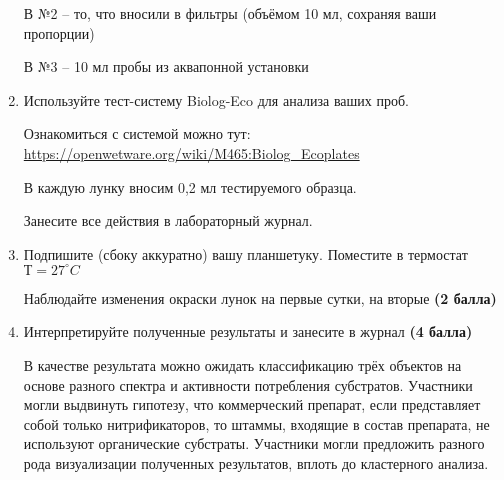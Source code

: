 \begin{enumerate}
    В №2 – то, что вносили в фильтры (объёмом 10 мл, сохраняя ваши пропорции)
    
    В №3 – 10 мл пробы из аквапонной установки

    \item Используйте тест-систему Biolog-Eco для анализа ваших проб.
    
    Ознакомиться с системой можно тут: \url{https://openwetware.org/wiki/M465:Biolog_Ecoplates}

    В каждую лунку вносим 0,2 мл тестируемого образца.

    Занесите все действия в лабораторный журнал.

    \item Подпишите (сбоку аккуратно) вашу планшетуку. Поместите в термостат $Т=27^\circ C$
    
    Наблюдайте изменения окраски лунок на первые сутки, на вторые \textbf{(2 балла)}


    \item Интерпретируйте полученные результаты и занесите в журнал \textbf{(4 балла)}
    
    \answerMath

    В качестве результата можно ожидать классификацию трёх объектов на основе разного спектра и активности потребления субстратов. Участники могли выдвинуть гипотезу, что коммерческий препарат, если представляет собой только нитрификаторов, то штаммы, входящие в состав препарата, не используют органические субстраты. Участники могли предложить разного рода визуализации полученных результатов, вплоть до кластерного анализа.
\end{enumerate}